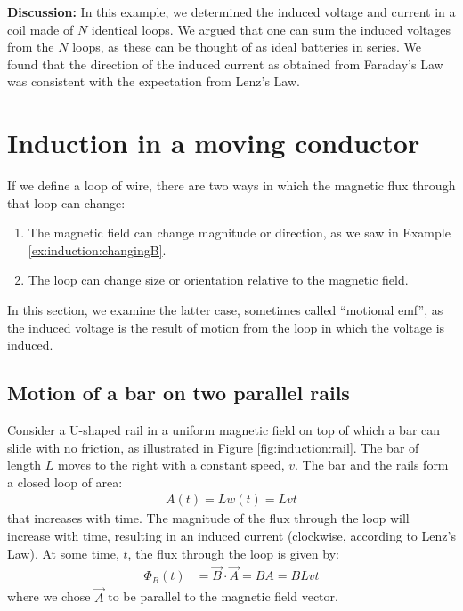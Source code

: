 \begin{example}
\textbf{Discussion: }In this example, we determined the induced voltage and current in a coil made of $N$ identical loops. We argued that one can sum the induced voltages from the $N$ loops, as these can be thought of as ideal batteries in series. We found that the direction of the induced current as obtained from Faraday's Law was consistent with the expectation from Lenz's Law.
\end{example}

\section{Induction in a moving conductor}
If we define a loop of wire, there are two ways in which the magnetic flux through that loop can change:
\begin{enumerate}
\item The magnetic field can change magnitude or direction, as we saw in Example \ref{ex:induction:changingB}.
\item The loop can change size or orientation relative to the magnetic field.
\end{enumerate}
In this section, we examine the latter case, sometimes called ``motional emf'', as the induced voltage is the result of motion from the loop in which the voltage is induced. 

\subsection{Motion of a bar on two parallel rails}
Consider a U-shaped rail in a uniform magnetic field on top of which a bar can slide with no friction, as illustrated in Figure \ref{fig:induction:rail}. The bar of length $L$ moves to the right with a constant speed, $v$. 
The bar and the rails form a closed loop of area:
\begin{align*}
A(t)=Lw(t)=Lvt
\end{align*} 
that increases with time. The magnitude of the flux through the loop will increase with time, resulting in an induced current (clockwise, according to Lenz's Law). At some time, $t$, the flux through the loop is given by:
\begin{align*}
\Phi_B (t) &=  \vec B \cdot \vec A =BA=BLvt
\end{align*}
where we chose $\vec A$ to be parallel to the magnetic field vector. 

